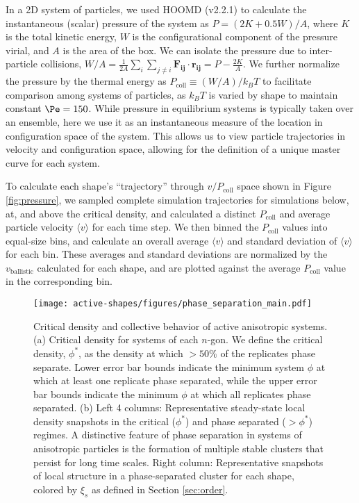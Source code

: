 In a 2D system of particles, we used HOOMD (v2.2.1) to calculate the instantaneous (scalar) pressure of the system as $P=(2K + 0.5W)/A$, where $K$ is the total kinetic energy, $W$ is the configurational component of the pressure virial, and $A$ is the area of the box.
We can isolate the pressure due to inter-particle collisions, $W/A=\frac{1}{2A}\sum_i\sum_{j\neq{i}}\bm{F_{ij}}\cdot\bm{r_{ij}}=P-\frac{2K}{A}$.
We further normalize the pressure by the thermal energy as $P_\text{coll}\equiv(W/A)/k_BT$ to facilitate comparison among systems of particles, as $k_BT$ is varied by shape to maintain constant $\Pe=150$.
While pressure in equilibrium systems is typically taken over an ensemble, here we use it as an instantaneous measure of the location in configuration space of the system.
This allows us to view particle trajectories in velocity and configuration space, allowing for the definition of a unique master curve for each system.

To calculate each shape's ``trajectory'' through $v/P_\text{coll}$ space shown in Figure \ref{fig:pressure}, we sampled complete simulation trajectories for simulations below, at, and above the critical density, and calculated a distinct $P_\text{coll}$ and average particle velocity ${\langle}v{\rangle}$ for each time step.
We then binned the $P_\text{coll}$ values into equal-size bins, and calculate an overall average ${\langle}v{\rangle}$ and standard deviation of ${\langle}v{\rangle}$ for each bin.
These averages and standard deviations are normalized by the $v_\text{ballistic}$ calculated for each shape, and are plotted against the average $P_\text{coll}$ value in the corresponding bin.


\begin{figure}[T]
\begin{center}
\texttt{[image: active-shapes/figures/phase\_separation\_main.pdf]}
\caption{
Critical density and collective behavior of active anisotropic systems.
(a) Critical density for systems of each $n$-gon.
We define the critical density, $\phi^*$, as the density at which $>50\%$ of the replicates phase separate.
Lower error bar bounds indicate the minimum system $\phi$ at which at least one replicate phase separated, while the upper error bar bounds indicate the minimum $\phi$ at which all replicates phase separated.
(b) Left 4 columns: Representative steady-state local density snapshots in the critical ($\phi^*$) and phase separated ($>\phi^*$) regimes.
A distinctive feature of phase separation in systems of anisotropic particles is the formation of multiple stable clusters that persist for long time scales.
Right column: Representative snapshots of local structure in a phase-separated cluster for each shape, colored by $\xi_s$ as defined in Section \ref{sec:order}.
}
\label{fig:phase_diagram}
\end{center}
\end{figure}

